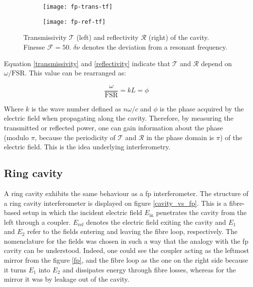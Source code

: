 \begin{figure}[h]
	\centering
	\begin{subfigure}{.5\textwidth}
		\centering
		\texttt{[image: fp-trans-tf]}
	\end{subfigure}%
	\begin{subfigure}{.5\textwidth}
		\centering
		\texttt{[image: fp-ref-tf]}
	\end{subfigure}
	\caption{Transmissivity $\mathcal{T}$ (left) and reflectivity $\mathcal{R}$ (right) of the cavity. Finesse $\mathcal{F}=50$. $\delta \nu$ denotes the deviation from a resonant frequency.}
	\label{fp-tf}
\end{figure}

Equation \eqref{transmissivity} and \eqref{reflectivity} indicate that $\mathcal{T}$ and $\mathcal{R}$ depend on $\omega/\text{FSR}$. This value can be rearranged as:

\begin{equation}
	\frac{\omega}{\text{FSR}} = kL = \phi
\end{equation}

Where $k$ is the wave number defined as $n \omega/c$ and $\phi$ is the phase acquired by the electric field when propagating along the cavity. Therefore, by measuring the transmitted or reflected power, one can gain information about the phase (modulo $\pi$, because the periodicity of $\mathcal{T}$ and $\mathcal{R}$ in the phase domain is $\pi$) of the electric field. This is the idea underlying interferometry.


\subsection{Ring cavity}

A ring cavity exhibits the same behaviour as a \gls{fp} interferometer. The structure of a ring cavity interferometer is displayed on figure \ref{cavity_vs_fp}. This is a fibre-based setup in which the incident electric field $E_{\text{in}}$ penetrates the cavity from the left through a coupler. $E_{\text{ref}}$ denotes the electric field exiting the cavity and $E_1$ and $E_2$ refer to the fields entering and leaving the fibre loop, respectively. The nomenclature for the fields was chosen in such a way that the analogy with the \gls{fp} cavity can be understood. Indeed, one could see the coupler acting as the leftmost mirror from the figure \ref{fp}, and the fibre loop as the one on the right side because it turns $E_1$ into $E_2$ and dissipates energy through fibre losses, whereas for the mirror it was by leakage out of the cavity.

